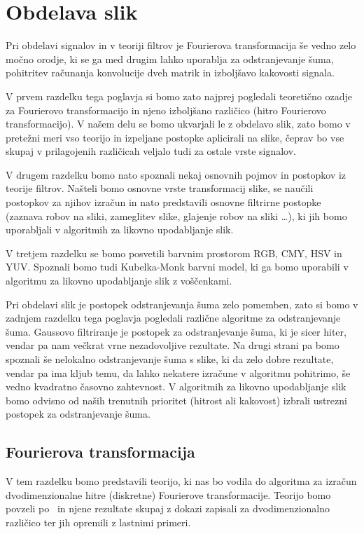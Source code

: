 \chapter{Obdelava slik}\label{sec:ObdelavaSlik}
Pri obdelavi signalov in v teoriji filtrov je Fourierova transformacija še vedno zelo močno orodje, ki se ga med drugim lahko uporablja za odstranjevanje šuma, pohitritev računanja konvolucije dveh matrik in izboljšavo kakovosti signala.

V prvem razdelku tega poglavja si bomo zato najprej pogledali teoretično ozadje za Fourierovo transformacijo in njeno izboljšano različico (hitro Fourierovo transformacijo). V našem delu se bomo ukvarjali le z obdelavo slik, zato bomo v pretežni meri vso teorijo in izpeljane postopke aplicirali na slike, čeprav bo vse skupaj v prilagojenih različicah veljalo tudi za ostale vrste signalov.

V drugem razdelku bomo nato spoznali nekaj osnovnih pojmov in postopkov iz teorije filtrov. Našteli bomo osnovne vrste transformacij slike, se naučili postopkov za njihov izračun in nato predstavili osnovne filtrirne postopke (zaznava robov na sliki, zameglitev slike, glajenje robov na sliki \ldots), ki jih bomo uporabljali v algoritmih za likovno upodabljanje slik.

V tretjem razdelku se bomo posvetili barvnim prostorom RGB, CMY, HSV in YUV. Spoznali bomo tudi Kubelka-Monk barvni model, ki ga bomo uporabili v algoritmu za likovno upodabljanje slik z voščenkami.

Pri obdelavi slik je postopek odstranjevanja šuma zelo pomemben, zato si bomo v zadnjem razdelku tega poglavja pogledali različne algoritme za odstranjevanje šuma. Gaussovo filtriranje je postopek za odstranjevanje šuma, ki je sicer hiter, vendar pa nam večkrat vrne nezadovoljive rezultate. Na drugi strani pa bomo spoznali še nelokalno odstranjevanje šuma s slike, ki da zelo dobre rezultate, vendar pa ima kljub temu, da lahko nekatere izračune v algoritmu pohitrimo, še vedno kvadratno časovno zahtevnost. V algoritmih za likovno upodabljanje slik bomo odvisno od naših trenutnih prioritet (hitrost ali kakovost) izbrali ustrezni postopek za odstranjevanje šuma.
%
\section{Fourierova transformacija}\label{sec:FourierT}
%
V tem razdelku bomo predstavili teorijo, ki nas bo vodila do algoritma za izračun dvodimenzionalne hitre (diskretne) Fourierove transformacije. Teorijo bomo povzeli po~\cite[2.~poglavje]{Frazier:AnIntro} in njene rezultate skupaj z dokazi zapisali za dvodimenzionalno različico ter jih opremili z lastnimi primeri. %
%

